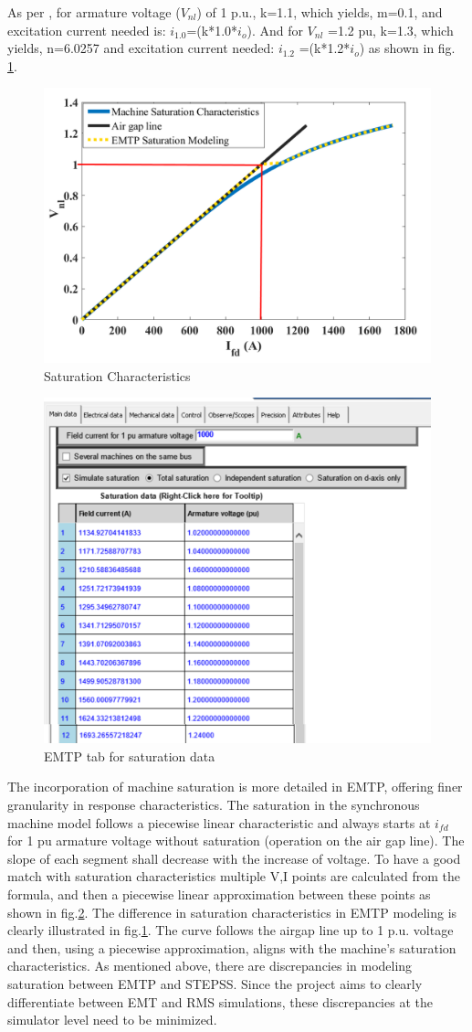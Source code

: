 \documentclass{report}
\begin{document}
\begin{itemize}
    As per \cite{van2015test}, for armature voltage ($V_{nl}$) of 1 p.u., k=1.1, which yields, m=0.1, and excitation current needed is: $i_{1.0}$=(k*1.0*$i_o$). And for $V_{nl}$ =1.2 pu, k=1.3, which yields, n=6.0257 and excitation current needed: $i_{1.2}$ =(k*1.2*$i_o$) as shown in fig. \ref{fig:saturation}.
        \begin{figure}[H]
        \centering
        \includegraphics[width=0.7\linewidth]{Figure_Nordic/Saturation.png}
        \caption{Saturation Characteristics}
        \label{fig:saturation}
    \end{figure}
    \begin{figure}
    \centering
    \includegraphics[width=0.5\linewidth]{EMTPSat.png}
    \caption{EMTP tab for saturation data}
    \label{fig:EMTPSat}
    \end{figure}
   
    The incorporation of machine saturation is more detailed in EMTP, offering finer granularity in response characteristics. The saturation in the synchronous machine model follows a piecewise linear characteristic and always starts at $i_{fd}$ for 1 pu armature voltage without saturation (operation on the air gap line). The slope of each segment shall decrease with the increase of voltage. To have a good match with saturation characteristics multiple V,I points are calculated from the formula, and then a piecewise linear approximation between these points as shown in fig.\ref{fig:EMTPSat}. The difference in saturation characteristics in EMTP modeling is clearly illustrated in fig.\ref{fig:saturation}. The curve follows the airgap line up to 1 p.u. voltage and then, using a piecewise approximation, aligns with the machine's saturation characteristics.
As mentioned above, there are discrepancies in modeling saturation between EMTP and STEPSS. Since the project aims to clearly differentiate between EMT and RMS simulations, these discrepancies at the simulator level need to be minimized.


\end{itemize}
\end{document}

